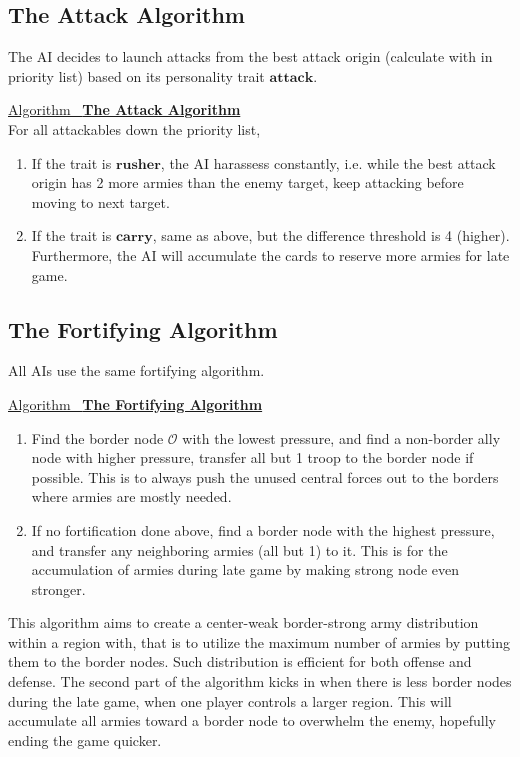 \documentclass[12pt]{article}  %
\newcommand{\algtitle}[1]{\underline{Algorithm \ {\bf #1}} \vspace*{1mm}\\}
\begin{document}
\subsection{The Attack Algorithm}
The AI decides to launch attacks from the best attack origin (calculate with in priority list) based on its personality trait $\textbf{attack}$.

\algtitle{The Attack Algorithm}
For all attackables down the priority list,
\begin{enumerate}
	\item If the trait is $\textbf{rusher}$, the AI harassess constantly, i.e. while the best attack origin has 2 more armies than the enemy target, keep attacking before moving to next target.
	\item If the trait is $\textbf{carry}$, same as above, but the difference threshold is 4 (higher). Furthermore, the AI will accumulate the cards to reserve more armies for late game.
\end{enumerate}








\subsection{The Fortifying Algorithm}
All AIs use the same fortifying algorithm.

\algtitle{The Fortifying Algorithm}

\begin{enumerate}
	\item Find the border node $\mathcal{O}$ with the lowest pressure, and find a non-border ally node with higher pressure, transfer all but 1 troop to the border node if possible. This is to always push the unused central forces out to the borders where armies are mostly needed.
	\item If no fortification done above, find a border node with the highest pressure, and transfer any neighboring armies (all but 1) to it. This is for the accumulation of armies during late game by making strong node even stronger.
\end{enumerate}


This algorithm aims to create a center-weak border-strong army distribution within a region with, that is to utilize the maximum number of armies by putting them to the border nodes. Such distribution is efficient for both offense and defense. The second part of the algorithm kicks in when there is less border nodes during the late game, when one player controls a larger region. This will accumulate all armies toward a border node to overwhelm the enemy, hopefully ending the game quicker.
\end{document}
